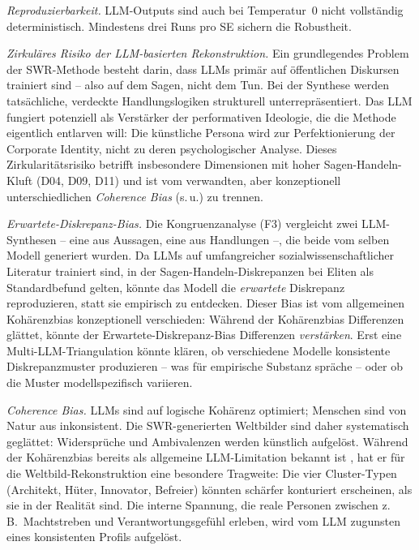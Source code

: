 \documentclass[12pt,a4paper]{article}
\begin{document}
\emph{Reproduzierbarkeit.} LLM-Outputs sind auch bei Temperatur~0 nicht vollst\"andig deterministisch. Mindestens drei Runs pro SE sichern die Robustheit.

\emph{Zirkul\"ares Risiko der LLM-basierten Rekonstruktion.} Ein grundlegendes Problem der SWR-Methode besteht darin, dass LLMs prim\"ar auf \"offentlichen Diskursen trainiert sind -- also auf dem \glqq Sagen\grqq, nicht dem \glqq Tun\grqq. Bei der Synthese werden tats\"achliche, verdeckte Handlungslogiken strukturell unterrepr\"asentiert. Das LLM fungiert potenziell als Verst\"arker der performativen Ideologie, die die Methode eigentlich entlarven will: Die k\"unstliche Persona wird zur Perfektionierung der Corporate Identity, nicht zu deren psychologischer Analyse. Dieses Zirkularit\"atsrisiko betrifft insbesondere Dimensionen mit hoher \glqq Sagen-Handeln-Kluft\grqq{} (D04, D09, D11) und ist vom verwandten, aber konzeptionell unterschiedlichen \emph{Coherence Bias} (s.\,u.) zu trennen.

\emph{Erwartete-Diskrepanz-Bias.} Die Kongruenzanalyse (F3) vergleicht zwei LLM-Synthesen -- eine aus Aussagen, eine aus Handlungen --, die beide vom selben Modell generiert wurden. Da LLMs auf umfangreicher sozialwissenschaftlicher Literatur trainiert sind, in der Sagen-Handeln-Diskrepanzen bei Eliten als Standardbefund gelten, k\"onnte das Modell die \emph{erwartete} Diskrepanz reproduzieren, statt sie empirisch zu entdecken. Dieser Bias ist vom allgemeinen Koh\"arenzbias konzeptionell verschieden: W\"ahrend der Koh\"arenzbias Differenzen gl\"attet, k\"onnte der Erwartete-Diskrepanz-Bias Differenzen \emph{verst\"arken}. Erst eine Multi-LLM-Triangulation k\"onnte kl\"aren, ob verschiedene Modelle konsistente Diskrepanzmuster produzieren -- was f\"ur empirische Substanz spr\"ache -- oder ob die Muster modellspezifisch variieren.

\emph{Coherence Bias.} LLMs sind auf logische Koh\"arenz optimiert; Menschen sind von Natur aus inkonsistent. Die SWR-generierten Weltbilder sind daher systematisch \glqq gegl\"attet\grqq{}: Widerspr\"uche und Ambivalenzen werden k\"unstlich aufgel\"ost. W\"ahrend der Koh\"arenzbias bereits als allgemeine LLM-Limitation bekannt ist \citep{Geiger2026SWR}, hat er f\"ur die Weltbild-Rekonstruktion eine besondere Tragweite: Die vier Cluster-Typen (Architekt, H\"uter, Innovator, Befreier) k\"onnten sch\"arfer konturiert erscheinen, als sie in der Realit\"at sind. Die interne Spannung, die reale Personen zwischen z.\,B.\ Machtstreben und Verantwortungsgef\"uhl erleben, wird vom LLM zugunsten eines konsistenten Profils aufgel\"ost.
\end{document}

